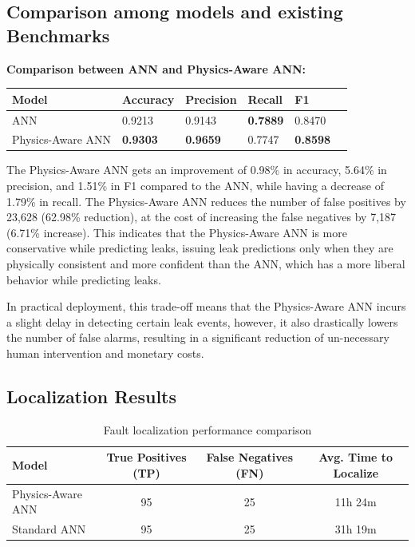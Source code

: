 \documentclass[final,5p,times,twocolumn,authoryear]{elsarticle}
\begin{document}
\subsection{Comparison among models and existing Benchmarks}

\textbf{Comparison between ANN and Physics-Aware ANN:}

\begin{table}[H]
\centering
\begin{tabular}{@{}llllll@{}}
\toprule
\textbf{Model}             & \textbf{Accuracy} & \textbf{Precision} & \textbf{Recall} & \textbf{F1}     \\ \midrule
ANN               & 0.9213   & 0.9143    & \textbf{0.7889} & 0.8470 \\
Physics-Aware ANN & \textbf{0.9303}   & \textbf{0.9659}    & 0.7747 & \textbf{0.8598}  
\end{tabular}
\end{table}

The Physics-Aware ANN gets an improvement of 0.98\% in accuracy, 5.64\% in precision, and 1.51\% in F1 compared to the ANN, while having a decrease of 1.79\% in recall. The Physics-Aware ANN reduces the number of false positives by 23,628 (62.98\% reduction), at the cost of increasing the false negatives by 7,187 (6.71\% increase). This indicates that the Physics-Aware ANN is more conservative while predicting leaks, issuing leak predictions only when they are physically consistent and more confident than the ANN, which has a more liberal behavior while predicting leaks.

In practical deployment, this trade-off means that the Physics-Aware ANN incurs a slight delay in detecting certain leak events, however, it also drastically lowers the number of false alarms, resulting in a significant reduction of un-necessary human intervention and monetary costs.

\subsection{Localization Results}

\begin{table}[H]
\centering
\begin{tabular}{lccc}
\hline
\textbf{Model} & \textbf{True Positives (TP)} & \textbf{False Negatives (FN)} & \textbf{Avg. Time to Localize} \\
\hline
Physics-Aware ANN & 95 & 25 & 11h 24m \\
Standard ANN      & 95 & 25 & 31h 19m \\
\hline
\end{tabular}
\caption{Fault localization performance comparison}
\end{table}
\end{document}
